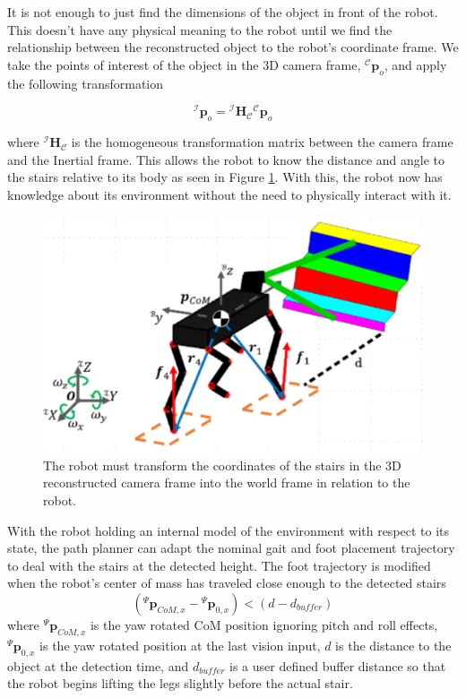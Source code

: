 It is not enough to just find the dimensions of the object in front of the robot. This doesn't have any physical meaning to the robot until we find the relationship between the reconstructed object to the robot's coordinate frame. We take the points of interest of the object in the 3D camera frame, ${}^\mathcal{C}\bm{p}_o$, and apply the following transformation

\begin{equation}
{}^\mathcal{I}\bm{p}_o = {}^\mathcal{I}\bm{H}_\mathcal{C}{}^\mathcal{C}\bm{p}_o
\end{equation}

where ${}^\mathcal{I}\bm{H}_\mathcal{C}$ is the homogeneous transformation matrix between the camera frame and the Inertial frame. This allows the robot to know the distance and angle to the stairs relative to its body as seen in Figure \ref{fig:RSR}. With this, the robot now has knowledge about its environment without the need to physically interact with it. 
\begin{figure}[!h]
\centering
\includegraphics[width=\columnwidth]{Figures/RobotStairsRelation.pdf}
\caption{The robot must transform the coordinates of the stairs in the 3D reconstructed camera frame into the world frame in relation to the robot.}
\label{fig:RSR}
\end{figure}
With the robot holding an internal model of the environment with respect to its state, the path planner can adapt the nominal gait and foot placement trajectory to deal with the stairs at the detected height. The foot trajectory is modified when the robot's center of mass has traveled close enough to the detected stairs
\begin{equation}
({}^\Psi\bm{p}_{CoM,x} - {}^\Psi\bm{p}_{0,x}) < (d - d_{buffer})
\end{equation}
where ${}^\Psi\bm{p}_{CoM,x}$ is the yaw rotated CoM position ignoring pitch and roll effects, ${}^\Psi\bm{p}_{0,x}$ is the yaw rotated position at the last vision input, $d$ is the distance to the object at the detection time, and $d_{buffer}$ is a user defined buffer distance so that the robot begins lifting the legs slightly before the actual stair.


